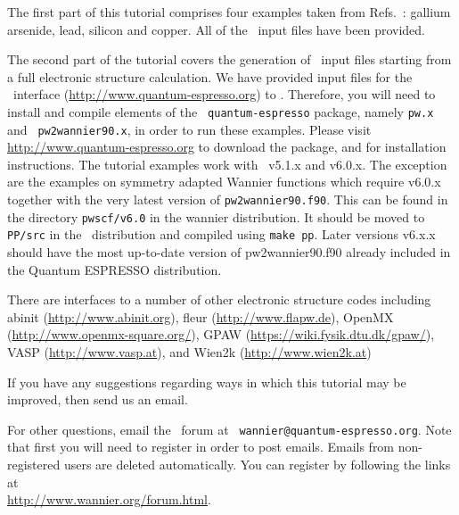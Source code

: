 \documentclass[a4paper,11pt,twoside]{article}
\begin{document}

The first part of this tutorial comprises four examples taken from
Refs.~\cite{marzari-prb97,souza-prb01}: gallium arsenide, lead,
silicon and copper. All of the \wannier\ input files have been
provided.

The second part of the tutorial covers the generation of \wannier\
input files starting from a full electronic structure calculation. We
have provided input files for the \pwscf\ interface (\url{http://www.quantum-espresso.org}) to \wannier. 
Therefore, you
will need to install and compile elements of the {\tt
  quantum-espresso} package, namely {\tt pw.x} and {\tt
  pw2wannier90.x}, in order to run these
examples. Please visit \url{http://www.quantum-espresso.org} to download the
package, and for installation instructions. 
The tutorial examples work with \pwscf\ v5.1.x and v6.0.x. The exception are the examples on symmetry adapted Wannier functions which require v6.0.x together with the  
very latest version of {\tt pw2wannier90.f90}. This can be found in the directory {\tt pwscf/v6.0} in the wannier distribution. It should be moved to {\tt PP/src} in the \pwscf\ distribution and compiled using {\tt make pp}. Later versions v6.x.x should have the most up-to-date version 
 of pw2wannier90.f90 already included in the Quantum ESPRESSO  
 distribution. 


There are interfaces to a number of other electronic structure codes
including {\sc abinit} (\url{http://www.abinit.org}), {\sc fleur}
(\url{http://www.flapw.de}),  {\sc OpenMX} (\url{http://www.openmx-square.org/}), 
{\sc GPAW} (\url{https://wiki.fysik.dtu.dk/gpaw/}), {\sc VASP} (\url{http://www.vasp.at}), and
{\sc Wien2k} (\url{http://www.wien2k.at})


If you have any suggestions regarding ways in which this tutorial may
be improved, then send us an email.

For other questions, email the \wannier\ forum at {\tt
  wannier@quantum-espresso.org}.  Note that first you will need to
register in order to post emails. Emails from non-registered users are
deleted automatically. You can register by following the links at\\
\url{http://www.wannier.org/forum.html}.



\cleardoublepage

\end{document}
